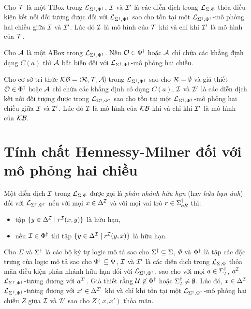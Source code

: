 \begin{Theorem}
\label{th:TBoxInvariant}
	Cho $\mathcal{T}$ là một TBox trong $\mathcal{L}_{\Sigma^\dag,\Phi^\dag}$, $\mathcal{I}$ và $\mathcal{I}'$ là các diễn dịch trong $\mathcal{L}_{\Sigma,\Phi}$ thỏa điều kiện kết nối đối tượng được đối với $\mathcal{L}_{\Sigma^\dag,\Phi^\dag}$ sao cho tồn tại một $\mathcal{L}_{\Sigma^\dag,\Phi^\dag}$-mô phỏng hai chiều giữa $\mathcal{I}$ và $\mathcal{I}'$. Lúc đó $\mathcal{I}$ là mô hình của $\mathcal{T}$ khi và chỉ khi $\mathcal{I}'$ là mô hình của $\mathcal{T}$.\myend
\end{Theorem}

\begin{Theorem}
\label{th:ABoxInvariant}
	Cho $\mathcal{A}$ là một ABox trong $\mathcal{L}_{\Sigma^\dag,\Phi^\dag}$. Nếu $\mathcal{O} \in \Phi^\dag$ hoặc $\mathcal{A}$ chỉ chứa các khẳng định dạng $C(a)$ thì $\mathcal{A}$ bất biến đối với $\mathcal{L}_{\Sigma^\dag,\Phi^\dag}$-mô phỏng hai chiều.\myend
\end{Theorem}

\begin{Corollary}
\label{co:KnowledgeBaseInvariant}
	Cho cơ sở tri thức $\mathcal{KB} = \left\langle\mathcal{R}, \mathcal{T}, \mathcal{A}\right\rangle\!$ trong $\mathcal{L}_{\Sigma^\dag,\Phi^\dag}$ sao cho $\mathcal{R} = \emptyset$ và giả thiết $\mathcal{O} \in \Phi^\dag$ hoặc $\mathcal{A}$ chỉ chứa các khẳng định có dạng $C(a)$, $\mathcal{I}$ và $\mathcal{I}'$ là các diễn dịch kết nối đối tượng được trong $\mathcal{L}_{\Sigma^\dag,\Phi^\dag}$ sao cho tồn tại một $\mathcal{L}_{\Sigma^\dag,\Phi^\dag}$-mô phỏng hai chiều giữa $\mathcal{I}$ và $\mathcal{I}'$. Lúc đó $\mathcal{I}$ là mô hình của $\mathcal{KB}$ khi và chỉ khi $\mathcal{I}'$ là mô hình của $\mathcal{KB}$.\myend
\end{Corollary}

\section{Tính chất Hennessy-Milner đối với mô phỏng hai chiều}

\begin{Definition}
\label{def:FiniteImage}
	Một diễn dịch $\mathcal{I}$ trong $\mathcal{L}_{\Sigma,\Phi}$ được gọi là {\em phân nhánh hữu hạn} (hay {\em hữu hạn ảnh}) đối với $\mathcal{L}_{\Sigma^\dag,\Phi^\dag}$ nếu với mọi $x \in \Delta^{\mathcal{I}}$ và với mọi vai trò $r \in \Sigma^\dag_{oR}$ thì:
	\begin{itemize}
		\item tập $\{y \in \Delta^{\mathcal{I}} \mid r^{\mathcal{I}}(x,y)\}$ là hữu hạn,
		
		\item nếu $\mathcal{I} \in \Phi^\dag$ thì tập $\{y \in \Delta^{\mathcal{I}} \mid r^{\mathcal{I}}(y, x)\}$ là hữu hạn.\myend
	\end{itemize}
\end{Definition}

\begin{Theorem}
\label{th:HennessyMilnerProperty}
	Cho $\Sigma$ và $\Sigma^\dag$ là các bộ ký tự logic mô tả sao cho $\Sigma^\dag \subseteq \Sigma$, $\Phi$ và $\Phi^\dag$ là tập các đặc trưng của logic mô tả sao cho $\Phi^\dag \subseteq \Phi$, $\mathcal{I}$ và $\mathcal{I}'$ là các diễn dịch trong $\mathcal{L}_{\Sigma,\Phi}$ thỏa mãn điều kiện phân nhánh hữu hạn đối với $\mathcal{L}_{\Sigma^\dag,\Phi^\dag}$, sao cho với mọi $a \in \Sigma^\dag_I$, $a^{\mathcal{I}}$ $\mathcal{L}_{\Sigma^\dag,\Phi^\dag}$-tương đương với $a^{\mathcal{I}'}$. Giả thiết rằng $\mathcal{U} \not \in \Phi^\dag$ hoặc $\Sigma^\dag_I \not= \emptyset$. Lúc đó, $x \in \Delta^{\mathcal{I}}$ $\mathcal{L}_{\Sigma^\dag,\Phi^\dag}$-tương đương với $x' \in \Delta^{\mathcal{I}'}$ khi và chỉ khi tồn tại một $\mathcal{L}_{\Sigma^\dag,\Phi^\dag}$-mô phỏng hai chiều $Z$ giữa $\mathcal{I}$ và $\mathcal{I}'$ sao cho $Z(x, x')$ thỏa mãn.\myend
\end{Theorem}

